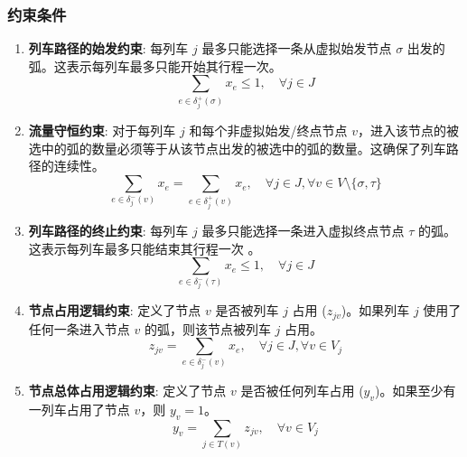 \documentclass{article}
\begin{document}
    \subsubsection{约束条件}
    \begin{enumerate}
        \item \textbf{列车路径的始发约束}:
        每列车 $j$ 最多只能选择一条从虚拟始发节点 $\sigma$ 出发的弧。这表示每列车最多只能开始其行程一次。
        \begin{equation}
            \sum_{e \in \delta_j^+(\sigma)} x_e \le 1, \quad \forall
            j \in J\label{eq:con_start}
        \end{equation}

        \item \textbf{流量守恒约束}:
        对于每列车 $j$ 和每个非虚拟始发/终点节点
        $v$，进入该节点的被选中的弧的数量必须等于从该节点出发的被选中的弧的数量。这确保了列车路径的连续性。
        \begin{equation}
            \sum_{e \in \delta_j^-(v)} x_e = \sum_{e \in
            \delta_j^+(v)} x_e, \quad \forall j \in J, \forall v \in
            V \setminus \{\sigma, \tau\}\label{eq:con_flow}
        \end{equation}

        \item \textbf{列车路径的终止约束}:
        每列车 $j$ 最多只能选择一条进入虚拟终点节点 $\tau$ 的弧。这表示每列车最多只能结束其行程一次 。
        \begin{equation}
            \sum_{e \in \delta_j^-(\tau)} x_e \le 1, \quad \forall j
            \in J\label{eq:con_end}
        \end{equation}

        \item \textbf{节点占用逻辑约束}:
        定义了节点 $v$ 是否被列车 $j$ 占用 ($z_{jv}$)。如果列车 $j$ 使用了任何一条进入节点 $v$
        的弧，则该节点被列车 $j$ 占用。
        \begin{equation}
            z_{jv} = \sum_{e \in \delta_j^-(v)} x_e, \quad \forall j
            \in J, \forall v \in V_j\label{eq:con_node_occupied}
        \end{equation}

        \item \textbf{节点总体占用逻辑约束}:
        定义了节点 $v$ 是否被任何列车占用 ($y_v$)。如果至少有一列车占用了节点 $v$，则 $y_v=1$。
        \begin{equation}
            y_v = \sum_{j \in T(v)} z_{jv}, \quad \forall v \in
            V_j\label{eq:con_node_occupied_total}
        \end{equation}


\end{enumerate}
\end{document}
